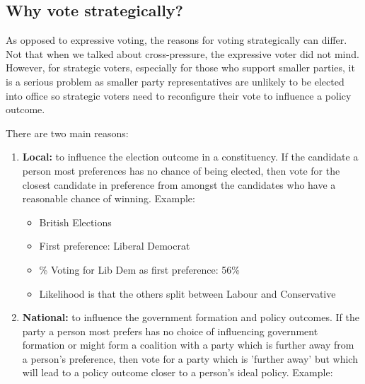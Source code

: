 \documentclass[12pt, letterpaper]{article}
\begin{document}
\subsection{Why vote strategically?}
As opposed to expressive voting, the reasons for voting strategically can differ. Not that when we talked about cross-pressure, the expressive voter did not mind. However, for strategic voters, especially for those who support smaller parties, it is a serious problem as smaller party representatives are unlikely to be elected into office so strategic voters need to reconfigure their vote to influence a policy outcome.

There are two main reasons:
\begin{enumerate}
	\item \textbf{Local:} to influence the election outcome in a constituency. If the candidate a person most preferences has no chance of being elected, then vote for the closest candidate in preference from amongst the candidates who have a reasonable chance of winning. Example:
		\begin{itemize}
			\item British Elections
			\item First preference: Liberal Democrat
			\item \% Voting for Lib Dem as first preference: 56\%
			\item Likelihood is that the others split between Labour and Conservative
		\end{itemize}
	\item \textbf{National:} to influence the government formation and policy outcomes. If the party a person most prefers has no choice of influencing government formation or might form a coalition with a party which is further away from a person's preference, then vote for a party which is 'further away' but which will lead to a policy outcome closer to a person's ideal policy. Example:\\
	\begin{center}
\end{center}
\end{enumerate}
\end{document}
